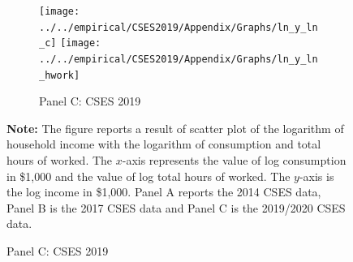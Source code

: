 \documentclass[11pt,letterpaper]{article}
\begin{document}
\begin{figure}[H]
\begin{subfigure}[b]{0.33\linewidth}
		\vspace{-2.5em}
		\newline {}
	\end{subfigure}
	\hfil
	\begin{subfigure}[b]{0.33\linewidth}
		\caption*{Panel C: CSES 2019} \vspace{-.5em}
		\label{fig:3c}
		\texttt{[image: ../../empirical/CSES2019/Appendix/Graphs/ln\_y\_ln\_c]} 
		\vspace{-2.5em}
		\newline {}
		\texttt{[image: ../../empirical/CSES2019/Appendix/Graphs/ln\_y\_ln\_hwork]} 
		\vspace{-2.5em}
		\newline {}
	\end{subfigure}
	\begin{tablenotes}
		\footnotesize
		\item \textbf{Note:} The figure reports a result of scatter plot of the logarithm of household income with the logarithm of consumption and total hours of worked. The $x$-axis represents the value of log consumption in \$1,000 and the value of log total hours of worked. The $y$-axis is the log income in \$1,000. Panel A reports the 2014 CSES data, Panel B is the 2017 CSES data and Panel C is the 2019/2020 CSES data.  
		
	\end{tablenotes} 
	
\end{figure}

\end{document}

